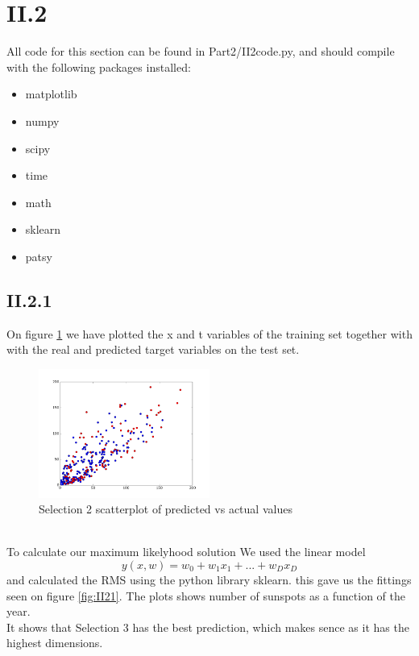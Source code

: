 \documentclass{article}
\begin{document}
\section{II.2}
All code for this section can be found in Part2/II2code.py, and should compile with the following packages installed:
\begin{itemize}
    \item matplotlib
    \item numpy
    \item scipy
    \item time
    \item math
    \item sklearn
    \item patsy
\end{itemize}

\subsection{II.2.1}

On figure \ref{fig:2scatter} we have plotted the x and t variables of the training set together with 
with the real and predicted target variables on the test set. 
\begin{figure}[h!]
    \centering
    \includegraphics[width=0.5\textwidth]{Part2/II212Scatter.png}
    \caption{Selection 2 scatterplot of predicted vs actual values}
    \label{fig:2scatter}
\end{figure}\\
To calculate our maximum likelyhood solution We used the linear model
\begin{equation*}
    y(x, w) = w_0 + w_1 x_1 + ... + w_D x_D
\end{equation*}
and calculated the RMS using the python library sklearn. this gave us the fittings seen on 
figure \ref{fig:II21}. The plots shows number of sunspots as a function of the year.\\
It shows that Selection 3 has the best prediction, which makes sence as it has the highest dimensions.
\end{document}
